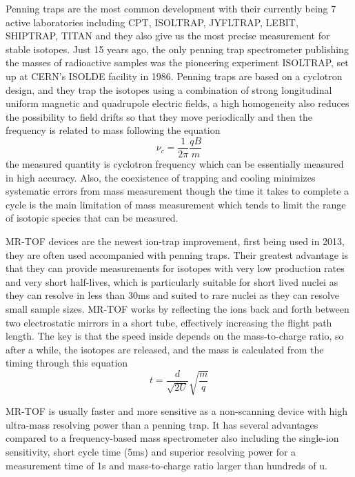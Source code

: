 Penning traps are the most common development with their currently being 7 active laboratories including CPT, ISOLTRAP, JYFLTRAP, LEBIT, SHIPTRAP, TITAN and they also give us the most precise measurement for stable isotopes.
Just 15 years ago, the only penning trap spectrometer publishing the masses of radioactive samples was the pioneering experiment ISOLTRAP, set up at CERN’s ISOLDE facility in 1986.
Penning traps are based on a cyclotron design, and they trap the isotopes using a combination of strong longitudinal uniform magnetic and quadrupole electric fields, a high homogeneity also reduces the possibility to field drifts so that they move periodically and then the frequency is related to mass following the equation
\begin{equation}
    \nu_c = \frac{1}{2\pi}\frac{qB}{m}
\end{equation}
the measured quantity is cyclotron frequency which can be essentially measured in high accuracy.
Also, the coexistence of trapping and cooling minimizes systematic errors from mass measurement though the time it takes to complete a cycle is the main limitation of mass measurement which tends to limit the range of isotopic species that can be measured.

MR-TOF devices are the newest ion-trap improvement, first being used in 2013, they are often used accompanied with penning traps.
Their greatest advantage is that they can provide measurements for isotopes with very low production rates and very short half-lives, which is particularly suitable for short lived nuclei as they can resolve in less than 30ms and suited to rare nuclei as they can resolve small sample sizes.
MR-TOF works by reflecting the ions back and forth between two electrostatic mirrors in a short tube, effectively increasing the flight path length.
The key is that the speed inside depends on the mass-to-charge ratio, so after a while, the isotopes are released, and the mass is calculated from the timing through this equation
\begin{equation}
    t = \frac{d}{\sqrt{2U}}\sqrt{\frac{m}{q}}
\end{equation}

MR-TOF is usually faster and more sensitive as a non-scanning device with high ultra-mass resolving power than a penning trap.
It has several advantages compared to a frequency-based mass spectrometer also including the single-ion sensitivity, short cycle time (5ms) and superior resolving power for a measurement time of 1s and mass-to-charge ratio larger than hundreds of u.
